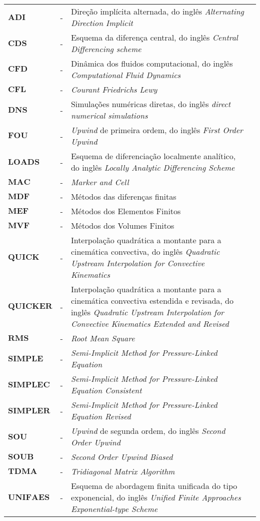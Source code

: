 \noindent
\begin{tabular}{l c p{.8\linewidth} c}
	$\textbf{ADI}$& - & Direção implícita alternada, do inglês \textit{Alternating Direction Implicit} \\
	$\textbf{CDS}$& - & Esquema da diferença central, do inglês \textit{Central Differencing scheme} \\
	$\textbf{CFD}$& - & Dinâmica dos fluidos computacional, do inglês \textit{Computational Fluid Dynamics} \\
	$\textbf{CFL}$& - & \textit{Courant Friedrichs Lewy} \\
	$\textbf{DNS}$& - & Simulações numéricas diretas, do inglês \textit{direct numerical simulations}\\
	$\textbf{FOU}$& - & \textit{Upwind} de primeira ordem, do inglês \textit{First Order Upwind} \\
	$\textbf{LOADS}$& - & Esquema de diferenciação localmente analítico, do inglês \textit{Locally Analytic Differencing Scheme} \\
	$\textbf{MAC}$& - & \textit{Marker and Cell}\\
	$\textbf{MDF}$& - & Métodos das diferenças finitas\\
	$\textbf{MEF}$& - & Métodos dos Elementos Finitos\\
	$\textbf{MVF}$& - & Métodos dos Volumes Finitos\\
	$\textbf{QUICK}$& - & Interpolação quadrática a montante para a cinemática convectiva, do inglês \textit{Quadratic Upstream Interpolation for Convective Kinematics} \\
	$\textbf{QUICKER}$& - & Interpolação quadrática a montante para a cinemática convectiva estendida e revisada, do inglês \textit{Quadratic Upstream Interpolation for Convective Kinematics Extended and Revised}\\
	$\textbf{RMS}$& - & \textit{Root Mean Square} \\
	$\textbf{SIMPLE}$& - & \textit{Semi-Implicit Method for Pressure-Linked Equation} \\
	$\textbf{SIMPLEC}$& - & \textit{Semi-Implicit Method for Pressure-Linked Equation Consistent} \\
	$\textbf{SIMPLER}$& - & \textit{Semi-Implicit Method for Pressure-Linked Equation Revised} \\
	$\textbf{SOU}$& - & \textit{Upwind} de segunda ordem, do inglês \textit{Second Order Upwind} \\
	$\textbf{SOUB}$& - & \textit{Second Order Upwind Biased} \\
	$\textbf{TDMA}$& - & \textit{Tridiagonal Matrix Algorithm} \\
	$\textbf{UNIFAES}$& - & Esquema de abordagem finita unificada do tipo exponencial, do inglês \textit{Unified Finite Approaches Exponential-type Scheme} \\
\end{tabular}
\newline \newline